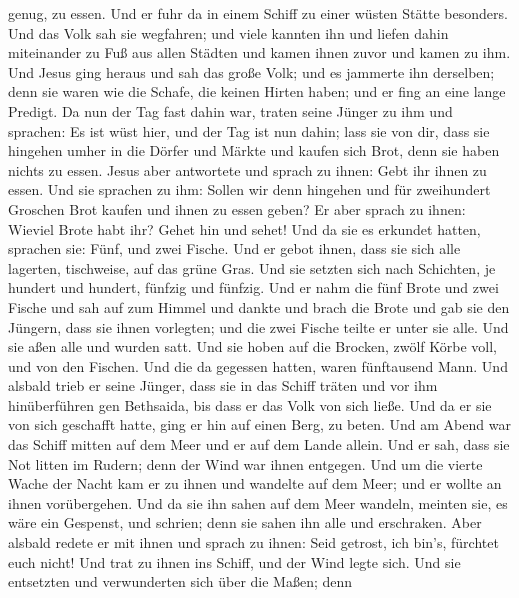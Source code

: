 genug, zu essen.  Und er fuhr da in einem Schiff zu einer
wüsten Stätte besonders.  Und das Volk sah sie wegfahren;
und viele kannten ihn und liefen dahin miteinander zu Fuß aus allen
Städten und kamen ihnen zuvor und kamen zu ihm.  Und Jesus
ging heraus und sah das große Volk; und es jammerte ihn derselben; denn
sie waren wie die Schafe, die keinen Hirten haben; und er fing an eine
lange Predigt.  Da nun der Tag fast dahin war, traten seine
Jünger zu ihm und sprachen: Es ist wüst hier, und der Tag ist nun dahin;
 lass sie von dir, dass sie hingehen umher in die Dörfer
und Märkte und kaufen sich Brot, denn sie haben nichts zu essen.
 Jesus aber antwortete und sprach zu ihnen: Gebt ihr ihnen
zu essen. Und sie sprachen zu ihm: Sollen wir denn hingehen und für
zweihundert Groschen Brot kaufen und ihnen zu essen geben? 
Er aber sprach zu ihnen: Wieviel Brote habt ihr? Gehet hin und sehet!
Und da sie es erkundet hatten, sprachen sie: Fünf, und zwei Fische.
 Und er gebot ihnen, dass sie sich alle lagerten,
tischweise, auf das grüne Gras.  Und sie setzten sich nach
Schichten, je hundert und hundert, fünfzig und fünfzig. 
Und er nahm die fünf Brote und zwei Fische und sah auf zum Himmel und
dankte und brach die Brote und gab sie den Jüngern, dass sie ihnen
vorlegten; und die zwei Fische teilte er unter sie alle. 
Und sie aßen alle und wurden satt.  Und sie hoben auf die
Brocken, zwölf Körbe voll, und von den Fischen.  Und die da
gegessen hatten, waren fünftausend Mann.  Und alsbald trieb
er seine Jünger, dass sie in das Schiff träten und vor ihm hinüberführen
gen Bethsaida, bis dass er das Volk von sich ließe.  Und da
er sie von sich geschafft hatte, ging er hin auf einen Berg, zu beten.
 Und am Abend war das Schiff mitten auf dem Meer und er auf
dem Lande allein.  Und er sah, dass sie Not litten im
Rudern; denn der Wind war ihnen entgegen. Und um die vierte Wache der
Nacht kam er zu ihnen und wandelte auf dem Meer;  und er
wollte an ihnen vorübergehen. Und da sie ihn sahen auf dem Meer wandeln,
meinten sie, es wäre ein Gespenst, und schrien;  denn sie
sahen ihn alle und erschraken. Aber alsbald redete er mit ihnen und
sprach zu ihnen: Seid getrost, ich bin's, fürchtet euch nicht!
 Und trat zu ihnen ins Schiff, und der Wind legte sich. Und
sie entsetzten und verwunderten sich über die Maßen;  denn
